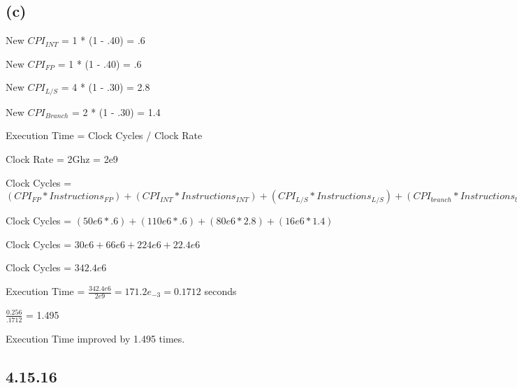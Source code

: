 \documentclass{article}
\begin{document}
    \subsection*{(c)}

    New $CPI_{INT}$ = 1 * (1 - .40) = .6

    New $CPI_{FP}$ = 1 * (1 - .40) = .6

    New $CPI_{L/S}$ = 4 * (1 - .30) = 2.8

    New $CPI_{Branch}$ = 2 * (1 - .30) = 1.4

    Execution Time = Clock Cycles / Clock Rate

    Clock Rate = 2Ghz = 2e9

    Clock Cycles = $(CPI_{FP} * Instructions_{FP}) + (CPI_{INT} * Instructions_{INT}) + (CPI_{L/S} * Instructions_{L/S}) + (CPI_{branch}* Instructions_{branch})$

    Clock Cycles = $(50e6 * .6) + (110e6 * .6) + (80e6 * 2.8) + (16e6 * 1.4)$

    Clock Cycles = $30e6 + 66e6 + 224e6 + 22.4e6$

    Clock Cycles = $342.4e6$

    Execution Time = $\frac{342.4e6}{2e9} = 171.2e_{-3} = 0.1712$ seconds

    $\frac{0.256}{.1712}$ = 1.495

    Execution Time improved by 1.495 times.

    \subsection*{4.15.16}
    
\end{document}
